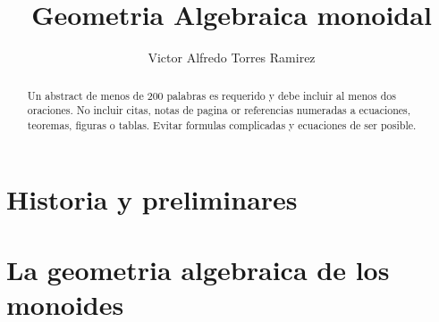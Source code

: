 \documentclass{amsart}
\begin{document}
\title{Geometria Algebraica monoidal}

\author{Victor Alfredo Torres Ramirez}

\begin{abstract}
Un abstract de menos de 200 palabras es requerido y debe incluir
al menos dos oraciones. No incluir citas, notas de pagina or referencias
numeradas a ecuaciones, teoremas, figuras o tablas.
Evitar formulas complicadas y ecuaciones de ser posible.
\end{abstract}

\maketitle

\tableofcontents

\part{Historia y preliminares}





\part{La geometria algebraica de los monoides}



\end{document}
